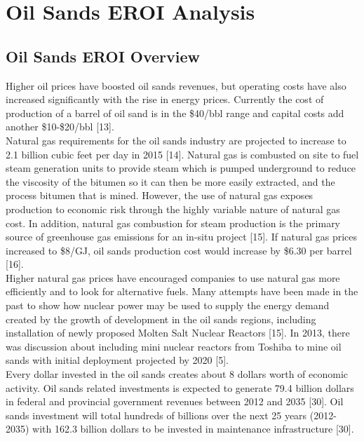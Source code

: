 \documentclass[11pt]{article}
\begin{document}

\section{Oil Sands EROI Analysis}

\subsection{Oil Sands EROI Overview}

Higher oil prices have boosted oil sands revenues, but operating costs have also increased significantly with the rise in energy prices. Currently the cost of production of a barrel of oil sand is in the \$40/bbl range and capital costs add another \$10-\$20/bbl [13].\\

Natural gas requirements for the oil sands industry are projected to increase to 2.1 billion cubic feet per day in 2015 [14]. Natural gas is combusted on site to fuel steam generation units to provide steam which is pumped underground to reduce the viscosity of the bitumen so it can then be more easily extracted, and the process bitumen that is mined. However, the use of natural gas exposes production to economic risk through the highly variable nature of natural gas cost. In addition, natural gas combustion for steam production is the primary source of greenhouse gas emissions for an in-situ project [15]. If natural gas prices increased to \$8/GJ, oil sands production cost would increase by \$6.30 per barrel [16].\\ 

Higher natural gas prices have encouraged companies to use natural gas more efficiently and to look for alternative fuels.  Many attempts have been made in the past to show how nuclear power may be used to supply the energy demand created by the growth of development in the oil sands regions, including installation of newly proposed Molten Salt Nuclear Reactors [15]. In 2013, there was discussion about including mini nuclear reactors from Toshiba to mine oil sands with initial deployment projected by 2020 [5].\\

Every dollar invested in the oil sands creates about 8 dollars worth of economic activity. Oil sands related investments is expected to generate 79.4 billion dollars in federal and provincial government revenues between 2012 and 2035 [30]. Oil sands investment will total hundreds of billions over the next 25 years (2012-2035) with 162.3 billion dollars to be invested in maintenance infrastructure [30]. \\
\end{document}
